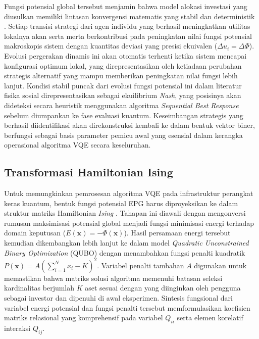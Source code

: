 Fungsi potensial global tersebut menjamin bahwa model alokasi investasi yang diusulkan memiliki lintasan konvergensi matematis yang stabil dan deterministik \cite{jain_multi-portfolio_2012}. Setiap transisi strategi dari agen individu yang berhasil meningkatkan utilitas lokalnya akan serta merta berkontribusi pada peningkatan nilai fungsi potensial makroskopis sistem dengan kuantitas deviasi yang presisi ekuivalen ($\Delta u_i = \Delta \Phi$). Evolusi pergerakan dinamis ini akan otomatis terhenti ketika sistem mencapai konfigurasi optimum lokal, yang direpresentasikan oleh ketiadaan perubahan strategis alternatif yang mampu memberikan peningkatan nilai fungsi lebih lanjut. Kondisi stabil puncak dari evolusi fungsi potensial ini dalam literatur fisika sosial direpresentasikan sebagai ekuilibrium \textit{Nash}, yang posisinya akan dideteksi secara heuristik menggunakan algoritma \textit{Sequential Best Response} sebelum diumpankan ke fase evaluasi kuantum. Keseimbangan strategis yang berhasil diidentifikasi akan direkonstruksi kembali ke dalam bentuk vektor biner, berfungsi sebagai basis parameter pemicu awal yang esensial dalam kerangka operasional algoritma VQE secara keseluruhan.

\subsection{Transformasi Hamiltonian Ising}

Untuk memungkinkan pemrosesan algoritma VQE pada infrastruktur perangkat keras kuantum, bentuk fungsi potensial EPG harus diproyeksikan ke dalam struktur matriks Hamiltonian \textit{Ising} \cite{lucas_ising_2014}. Tahapan ini diawali dengan mengonversi rumusan maksimisasi potensial global menjadi fungsi minimisasi energi terhadap domain keputusan ($E(\mathbf{x}) = -\Phi(\mathbf{x})$). Hasil persamaan energi tersebut kemudian dikembangkan lebih lanjut ke dalam model \textit{Quadratic Unconstrained Binary Optimization} (QUBO) dengan menambahkan fungsi penalti kuadratik $P(\mathbf{x}) = A\left(\sum_{i=1}^N x_i - K\right)^2$. Variabel penalti tambahan $A$ digunakan untuk memastikan bahwa matriks solusi algoritma memenuhi batasan seleksi kardinalitas berjumlah $K$ aset sesuai dengan yang diinginkan oleh pengguna sebagai investor dan dipenuhi di awal eksperimen. Sintesis fungsional dari variabel energi potensial dan fungsi penalti tersebut memformulasikan koefisien matriks relasional yang komprehensif pada variabel $Q_{ii}$ serta elemen korelatif interaksi $Q_{ij}$.

